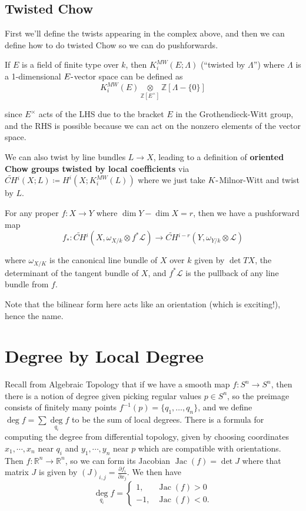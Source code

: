 \documentclass[11pt]{scrreprt}
\theoremstyle{definition}
\newcommand{\RR}[0]{{\mathbb{R}}}
\newcommand{\ZZ}[0]{{\mathbb{Z}}}
\newcommand{\theset}[1]{\{{#1}\}}
\newcommand{\dd}[2]{{\frac{\partial #1}{\partial #2}}}
\newcommand{\tensor}[0]{\otimes}
\newcommand{\dash}[0]{{\hbox{-}}}
\newcommand{\definedas}[0]{\coloneqq}
\newcommand{\inv}[0]{^{-1}}
\begin{document}
\hypertarget{twisted-chow}{%
\subsection{Twisted Chow}\label{twisted-chow}}

First we'll define the twists appearing in the complex above, and then
we can define how to do twisted Chow so we can do pushforwards.

If \(E\) is a field of finite type over \(k\), then
\(K^{MW}_i(E; \Lambda)\) (``twisted by \(\Lambda\)'') where \(\Lambda\)
is a 1-dimensional \(E\dash\)vector space can be defined as \[
K^{MW}_i(E) \underset{\ZZ[E^\times]}\tensor \ZZ[\Lambda - \theset{0}]
\]

since \(E^\times\) acts of the LHS due to the bracket \(E\) in the
Grothendieck-Witt group, and the RHS is possible because we can act on
the nonzero elements of the vector space.

We can also twist by line bundles \(L \to X\), leading to a definition
of \textbf{oriented Chow groups twisted by local coefficients} via
\(\widetilde{CH}{}^i(X; L) \definedas H^i(X; K^{MW}_i(L))\) where we
just take \(K\dash\)Milnor-Witt and twist by \(L\).

For any proper \(f: X\to Y\) where \(\dim Y - \dim X = r\), then we have
a pushforward map \[
f_*: \widetilde{CH}{}^i(X, \omega_{X/k}\tensor f^* \mathcal L) \to \widetilde{CH}{}^{i-r}(Y, \omega_{Y/k}\tensor \mathcal L)
\]

where \(\omega_{X/K}\) is the canonical line bundle of \(X\) over \(k\)
given by \(\det TX\), the determinant of the tangent bundle of \(X\),
and \(f^* \mathcal L\) is the pullback of any line bundle from \(f\).

Note that the bilinear form here acts like an orientation (which is
exciting!), hence the name.

\hypertarget{degree-by-local-degree}{%
\section{Degree by Local Degree}\label{degree-by-local-degree}}

Recall from Algebraic Topology that if we have a smooth map
\(f:S^n \to S^n\), then there is a notion of degree given picking
regular values \(p\in S^n\), so the preimage consists of finitely many
points \(f\inv(p) = \theset{q_1, \dots, q_n}\), and we define
\(\deg f = \sum \underset{q_i}\deg f\) to be the sum of local degrees.
There is a formula for computing the degree from differential topology,
given by choosing coordinates \(x_1, \cdots, x_n\) near \(q_i\) and
\(y_1, \cdots, y_n\) near \(p\) which are compatible with orientations.
Then \(f:\RR^n\to\RR^n\), so we can form its Jacobian
\(\operatorname{Jac}(f) = \det J\) where that matrix \(J\) is given by
\((J)_{i,j} = \dd{f_i}{x_j}\). We then have \[
\underset{q_i}\deg f = \begin{cases}
    1,  & \operatorname{Jac}(f) > 0 \\
    -1, & \operatorname{Jac}(f) < 0.
\end{cases}
\]
\end{document}
